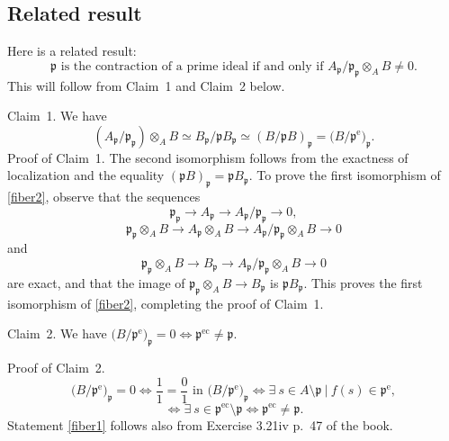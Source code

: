 \documentclass[parskip=half,fontsize=12pt]{scrartcl}%
\newcommand{\oo}{\operatorname}\newcommand{\ooo}{\operatorname*}
\newcommand{\mf}{\mathfrak}
\newcommand{\ppp}{\mf p}
\begin{document}
\subsection{Related result}\label{res}%

Here is a related result:
\begin{equation}\label{fiber1}
\ppp\text{ is the contraction of a prime ideal if and only if }A_\ppp/\ppp_\ppp\otimes_AB\ne0.
\end{equation}
This will follow from Claim~1 and Claim~2 below.

Claim~1. We have 
\begin{equation}\label{fiber2}
(A_\ppp/\ppp_\ppp)\otimes_AB\simeq B_\ppp/\ppp B_\ppp\simeq(B/\ppp B)_\ppp=\big(B/\ppp^{\oo e}\big)_\ppp.%
\end{equation} 
Proof of Claim~1. The second isomorphism follows from the exactness of localization and the equality $(\ppp B)_\ppp=\ppp B_\ppp$. %
To prove the first isomorphism of \eqref{fiber2}, observe that the sequences 
$$
\ppp_\ppp\to A_\ppp\to A_\ppp/\ppp_\ppp\to0,
$$ 
$$
\ppp_\ppp\otimes_AB\to A_\ppp\otimes_AB\to A_\ppp/\ppp_\ppp\otimes_AB\to0
$$ 
and 
$$
\ppp_\ppp\otimes_AB\to B_\ppp\to A_\ppp/\ppp_\ppp\otimes_AB\to0
$$ 
are exact, and that the image of $\ppp_\ppp\otimes_AB\to B_\ppp$ is $\ppp B_\ppp$. This proves the first isomorphism of \eqref{fiber2}, completing the proof of Claim~1. 

Claim~2. We have $\big(B/\ppp^{\oo e}\big)_\ppp=0\iff\ppp^{\oo{ec}}\ne\ppp$. 

Proof of Claim~2. 
$$
\big(B/\ppp^{\oo e}\big)_\ppp=0\iff\frac11=\frac01\text{ in }\big(B/\ppp^{\oo e}\big)_\ppp\iff\exists\ s\in A\setminus\ppp\ |\ f(s)\in\ppp^{\oo e},
$$ 
$$
\iff\exists\ s\in\ppp^{\oo{ec}}\setminus\ppp\iff\ppp^{\oo{ec}}\ne\ppp.
$$ 
Statement \eqref{fiber1} follows also from Exercise 3.21iv p.~47 of the book.
\end{document}
